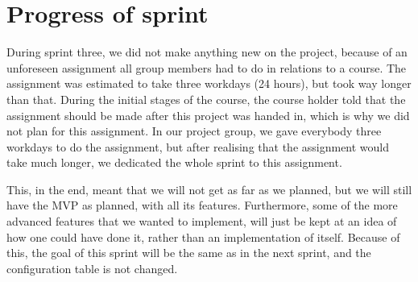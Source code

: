 \section{Progress of sprint}
During sprint three, we did not make anything new on the project, because of an unforeseen assignment all group members had to do in relations to a course.
The assignment was estimated to take three workdays (24 hours), but took way longer than that.
During the initial stages of the course, the course holder told that the assignment should be made after this project was handed in, which is why we did not plan for this assignment.
In our project group, we gave everybody three workdays to do the assignment, but after realising that the assignment would take much longer, we dedicated the whole sprint to this assignment.

This, in the end, meant that we will not get as far as we planned, but we will still have the MVP as planned, with all its features.
Furthermore, some of the more advanced features that we wanted to implement, will just be kept at an idea of how one could have done it, rather than an implementation of itself.
Because of this, the goal of this sprint will be the same as in the next sprint, and the configuration table is not changed.